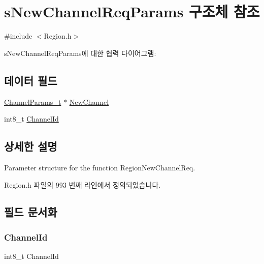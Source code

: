 \hypertarget{structs_new_channel_req_params}{}\section{s\+New\+Channel\+Req\+Params 구조체 참조}
\label{structs_new_channel_req_params}


{\ttfamily \#include $<$Region.\+h$>$}



s\+New\+Channel\+Req\+Params에 대한 협력 다이어그램\+:
\subsection*{데이터 필드}
\begin{DoxyCompactItemize}
\item 
\mbox{\hyperlink{group___l_o_r_a_m_a_c_ga1360ca6f82c6d125ea43a9dad9b56184}{Channel\+Params\+\_\+t}} $\ast$ \mbox{\hyperlink{structs_new_channel_req_params_afc31493a105479490228fd896b20b45c}{New\+Channel}}
\item 
int8\+\_\+t \mbox{\hyperlink{structs_new_channel_req_params_ab072d8ed1ab01d956d5b86a9d0185c3f}{Channel\+Id}}
\end{DoxyCompactItemize}


\subsection{상세한 설명}
Parameter structure for the function Region\+New\+Channel\+Req. 

Region.\+h 파일의 993 번째 라인에서 정의되었습니다.



\subsection{필드 문서화}
\mbox{\label{structs_new_channel_req_params_ab072d8ed1ab01d956d5b86a9d0185c3f}} 
\subsubsection{\texorpdfstring{Channel\+Id}{ChannelId}}
{\footnotesize\ttfamily int8\+\_\+t Channel\+Id}

